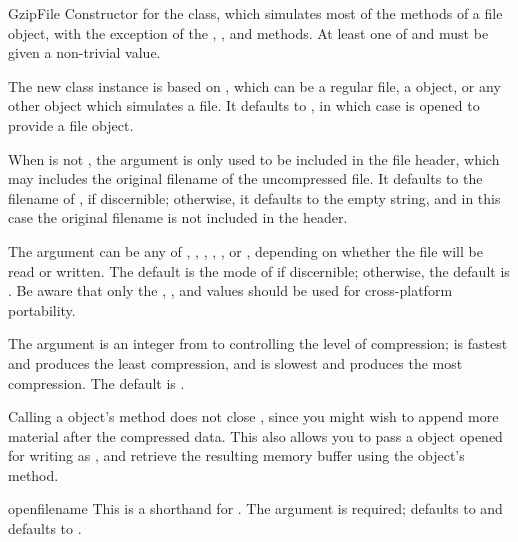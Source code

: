\begin{classdesc}{GzipFile}{}
Constructor for the  class, which simulates most of
the methods of a file object, with the exception of the ,
, and  methods.  At least one of
 and  must be given a non-trivial value.

The new class instance is based on , which can be a
regular file, a  object, or any other object which
simulates a file.  It defaults to , in which case
 is opened to provide a file object.

When  is not , the  argument is
only used to be included in the  file header, which may
includes the original filename of the uncompressed file.  It defaults
to the filename of , if discernible; otherwise, it
defaults to the empty string, and in this case the original filename
is not included in the header.

The  argument can be any of , ,
, , , or , depending on
whether the file will be read or written.  The default is the mode of
 if discernible; otherwise, the default is .
Be aware that only the , , and 
values should be used for cross-platform portability.

The  argument is an integer from  to
 controlling the level of compression;  is fastest and
produces the least compression, and  is slowest and produces
the most compression.  The default is .

Calling a  object's  method does not
close , since you might wish to append more material
after the compressed data.  This also allows you to pass a
 object opened for writing as , and
retrieve the resulting memory buffer using the 
object's  method.
\end{classdesc}

\begin{funcdesc}{open}{filename}
This is a shorthand for 
 .  The 
argument is required;  defaults to  and
 defaults to .
\end{funcdesc}

\begin{seealso}
\end{seealso}
